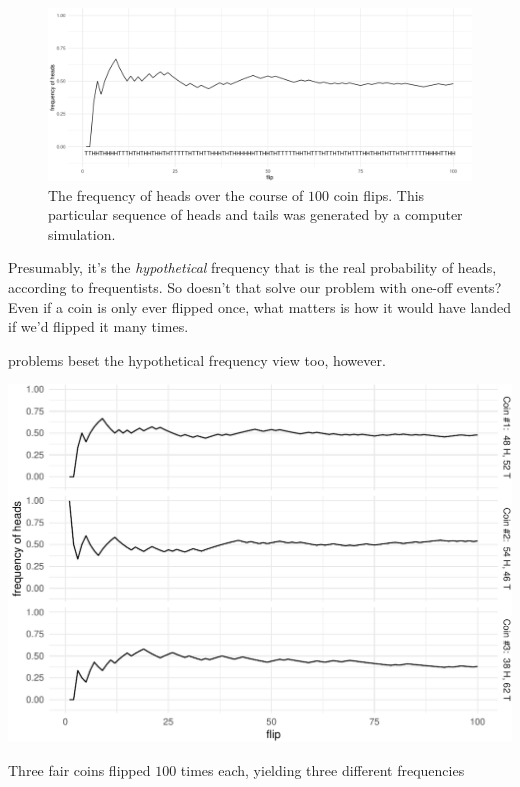 \documentclass[justified]{tufte-book}
\theoremstyle{definition}
\theoremstyle{definition}
\theoremstyle{definition}
\theoremstyle{remark}
\begin{document}
\begin{figure}
\includegraphics{_main_files/figure-latex/hundredflips-1} \caption[The frequency of heads over the course of $100$ coin flips]{The frequency of heads over the course of $100$ coin flips. This particular sequence of heads and tails was generated by a computer simulation.}\label{fig:hundredflips}
\end{figure}

Presumably, it's the \emph{hypothetical} frequency that is the real
probability of heads, according to frequentists. So doesn't that solve
our problem with one-off events? Even if a coin is only ever flipped
once, what matters is how it would have landed if we'd flipped it many
times.

 problems beset the hypothetical frequency view too,
however.

\begin{marginfigure}
\includegraphics{_main_files/figure-latex/threecoins-1} \caption[Three fair coins flipped $100$ times each, yielding three different frequencies]{Three fair coins flipped $100$ times each, yielding three different frequencies}\label{fig:threecoins}
\end{marginfigure}
\end{document}
